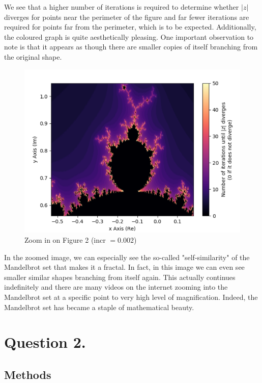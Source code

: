 \documentclass{article}
\begin{document}
We see that a higher number of iterations is required to determine whether $\left| z \right|$ diverges for points near the perimeter of the figure and far fewer iterations are
required for points far from the perimeter, which is to be expected. Additionally, the coloured graph is quite aesthetically pleasing. One important observation to note is that it appears as though there are smaller copies of itself branching from the original shape.

\begin{figure}[h]
  \centering
\includegraphics[scale=0.5]{Zoomed In}
\caption{Zoom in on Figure 2 (incr $ = 0.002$)}
\end{figure}

In the zoomed image, we can especially see the so-called "self-similarity" of
the Mandelbrot set that makes it a fractal. In fact, in this image we can even
see smaller similar shapes branching from itself again. This actually
continues indefinitely and there are many videos on the internet zooming into the
Mandelbrot set at a specific point to very high level of magnification. Indeed, the Mandelbrot set has became a staple of mathematical beauty.

\section*{Question 2.}

\subsection*{Methods}
\end{document}
